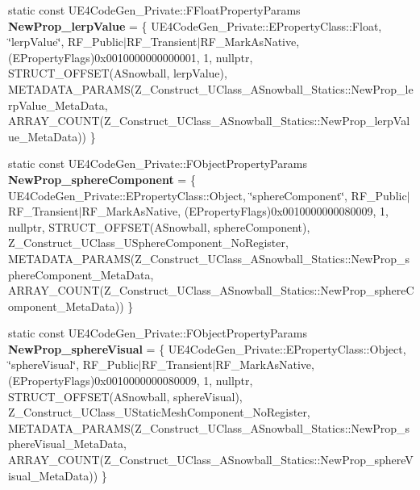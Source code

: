 \begin{DoxyCompactItemize}
\item 
\mbox{\label{struct_z___construct___u_class___a_snowball___statics_a0658f4e47c0ac370c1d11aeb53f82dd9}} 
static const U\+E4\+Code\+Gen\+\_\+\+Private\+::\+F\+Float\+Property\+Params {\bfseries New\+Prop\+\_\+lerp\+Value} = \{ U\+E4\+Code\+Gen\+\_\+\+Private\+::\+E\+Property\+Class\+::\+Float, \char`\"{}lerp\+Value\char`\"{}, R\+F\+\_\+\+Public$\vert$R\+F\+\_\+\+Transient$\vert$R\+F\+\_\+\+Mark\+As\+Native, (E\+Property\+Flags)0x0010000000000001, 1, nullptr, S\+T\+R\+U\+C\+T\+\_\+\+O\+F\+F\+S\+E\+T(\+A\+Snowball, lerp\+Value), M\+E\+T\+A\+D\+A\+T\+A\+\_\+\+P\+A\+R\+A\+M\+S(\+Z\+\_\+\+Construct\+\_\+\+U\+Class\+\_\+\+A\+Snowball\+\_\+\+Statics\+::\+New\+Prop\+\_\+lerp\+Value\+\_\+\+Meta\+Data, A\+R\+R\+A\+Y\+\_\+\+C\+O\+U\+N\+T(\+Z\+\_\+\+Construct\+\_\+\+U\+Class\+\_\+\+A\+Snowball\+\_\+\+Statics\+::\+New\+Prop\+\_\+lerp\+Value\+\_\+\+Meta\+Data)) \}
\item 
\mbox{\label{struct_z___construct___u_class___a_snowball___statics_ae22ebb5a7f98573b144b718a17f718f2}} 
static const U\+E4\+Code\+Gen\+\_\+\+Private\+::\+F\+Object\+Property\+Params {\bfseries New\+Prop\+\_\+sphere\+Component} = \{ U\+E4\+Code\+Gen\+\_\+\+Private\+::\+E\+Property\+Class\+::\+Object, \char`\"{}sphere\+Component\char`\"{}, R\+F\+\_\+\+Public$\vert$R\+F\+\_\+\+Transient$\vert$R\+F\+\_\+\+Mark\+As\+Native, (E\+Property\+Flags)0x0010000000080009, 1, nullptr, S\+T\+R\+U\+C\+T\+\_\+\+O\+F\+F\+S\+E\+T(\+A\+Snowball, sphere\+Component), Z\+\_\+\+Construct\+\_\+\+U\+Class\+\_\+\+U\+Sphere\+Component\+\_\+\+No\+Register, M\+E\+T\+A\+D\+A\+T\+A\+\_\+\+P\+A\+R\+A\+M\+S(\+Z\+\_\+\+Construct\+\_\+\+U\+Class\+\_\+\+A\+Snowball\+\_\+\+Statics\+::\+New\+Prop\+\_\+sphere\+Component\+\_\+\+Meta\+Data, A\+R\+R\+A\+Y\+\_\+\+C\+O\+U\+N\+T(\+Z\+\_\+\+Construct\+\_\+\+U\+Class\+\_\+\+A\+Snowball\+\_\+\+Statics\+::\+New\+Prop\+\_\+sphere\+Component\+\_\+\+Meta\+Data)) \}
\item 
\mbox{\label{struct_z___construct___u_class___a_snowball___statics_a88edb2f4993ea4bfaa752048729476e2}} 
static const U\+E4\+Code\+Gen\+\_\+\+Private\+::\+F\+Object\+Property\+Params {\bfseries New\+Prop\+\_\+sphere\+Visual} = \{ U\+E4\+Code\+Gen\+\_\+\+Private\+::\+E\+Property\+Class\+::\+Object, \char`\"{}sphere\+Visual\char`\"{}, R\+F\+\_\+\+Public$\vert$R\+F\+\_\+\+Transient$\vert$R\+F\+\_\+\+Mark\+As\+Native, (E\+Property\+Flags)0x0010000000080009, 1, nullptr, S\+T\+R\+U\+C\+T\+\_\+\+O\+F\+F\+S\+E\+T(\+A\+Snowball, sphere\+Visual), Z\+\_\+\+Construct\+\_\+\+U\+Class\+\_\+\+U\+Static\+Mesh\+Component\+\_\+\+No\+Register, M\+E\+T\+A\+D\+A\+T\+A\+\_\+\+P\+A\+R\+A\+M\+S(\+Z\+\_\+\+Construct\+\_\+\+U\+Class\+\_\+\+A\+Snowball\+\_\+\+Statics\+::\+New\+Prop\+\_\+sphere\+Visual\+\_\+\+Meta\+Data, A\+R\+R\+A\+Y\+\_\+\+C\+O\+U\+N\+T(\+Z\+\_\+\+Construct\+\_\+\+U\+Class\+\_\+\+A\+Snowball\+\_\+\+Statics\+::\+New\+Prop\+\_\+sphere\+Visual\+\_\+\+Meta\+Data)) \}

\end{DoxyCompactItemize}
